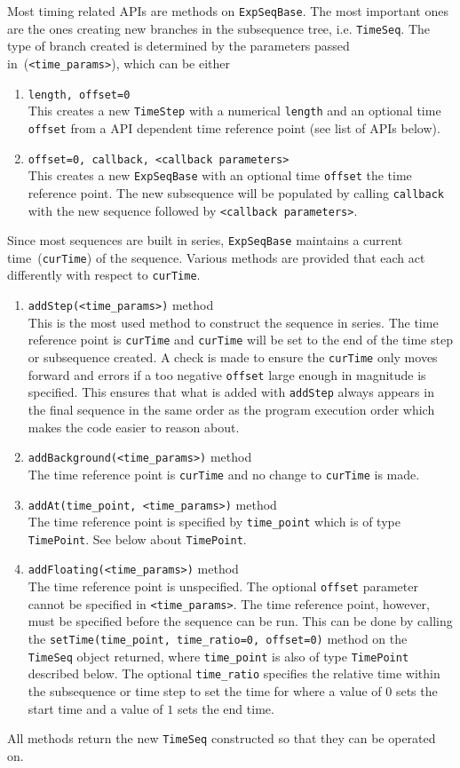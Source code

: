 Most timing related APIs are methods on \verb`ExpSeqBase`.
The most important ones are the ones creating new branches
in the subsequence tree, i.e. \verb`TimeSeq`.
The type of branch created is determined by the parameters passed in~(\verb`<time_params>`),
which can be either
\begin{enumerate}
\item \verb`length, offset=0`\\
  This creates a new \verb`TimeStep` with a numerical \verb`length`
  and an optional time \verb`offset` from a API dependent time reference point
  (see list of APIs below).
\item \verb`offset=0, callback, <callback parameters>`\\
  This creates a new \verb`ExpSeqBase` with an optional time \verb`offset`
  the time reference point.
  The new subsequence will be populated by calling \verb`callback`
  with the new sequence followed by \verb`<callback parameters>`.
\end{enumerate}
Since most sequences are built in series, \verb`ExpSeqBase` maintains
a current time~(\verb`curTime`) of the sequence.
Various methods are provided that each act differently with respect to \verb`curTime`.
\begin{enumerate}
\item \verb`addStep(<time_params>)` method\\
  This is the most used method to construct the sequence in series.
  The time reference point is \verb`curTime` and
  \verb`curTime` will be set to the end of the time step or subsequence created.
  A check is made to ensure the \verb`curTime` only moves forward and
  errors if a too negative \verb`offset` large enough in magnitude is specified.
  This ensures that what is added with \verb`addStep` always appears in the final
  sequence in the same order as the program execution order
  which makes the code easier to reason about.
\item \verb`addBackground(<time_params>)` method\\
  The time reference point is \verb`curTime` and no change to \verb`curTime` is made.
\item \verb`addAt(time_point, <time_params>)` method\\
  The time reference point is specified by \verb`time_point` which is of type \verb`TimePoint`.
  See below about \verb`TimePoint`.
\item \verb`addFloating(<time_params>)` method\\
  The time reference point is unspecified.
  The optional \verb`offset` parameter cannot be specified in \verb`<time_params>`.
  The time reference point, however, must be specified before the sequence can be run.
  This can be done by calling the \verb`setTime(time_point, time_ratio=0, offset=0)` method
  on the \verb`TimeSeq` object returned,
  where \verb`time_point` is also of type \verb`TimePoint` described below.
  The optional \verb`time_ratio` specifies the relative time within the subsequence
  or time step to set the time for where a value of $0$ sets the start time
  and a value of $1$ sets the end time.
\end{enumerate}
All methods return the new \verb`TimeSeq` constructed so that they can be operated on.

